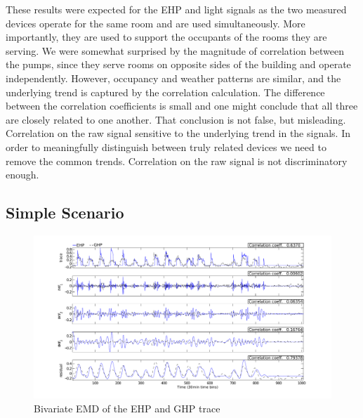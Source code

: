 These results were expected for the EHP and light signals as the two measured devices operate for the same room 
and are used simultaneously.  More importantly, they are used to support the occupants of the rooms they are serving.
We were somewhat surprised by the magnitude of correlation between the pumps, since they serve rooms on
opposite sides of the building and operate independently.  However, occupancy and weather patterns are similar,
and the underlying trend is captured by the correlation calculation.
The difference between the correlation coefficients is small and one might conclude that all three are
closely related to one another.  That conclusion is not false, but misleading.  Correlation on the raw 
signal sensitive to the underlying trend in the signals.  In order to meaningfully distinguish between
truly related devices we need to remove the common trends.  Correlation on the raw signal is not
discriminatory enough.


\subsection{Simple Scenario}

\begin{figure}[tb]
\hspace{-2cm}
\includegraphics[width=1.2\textwidth]{img/emd_25_41-eps-converted-to}
\vspace{-1cm}
\caption{Bivariate EMD of the EHP and GHP trace}
\label{fig:emd2}
\end{figure}

